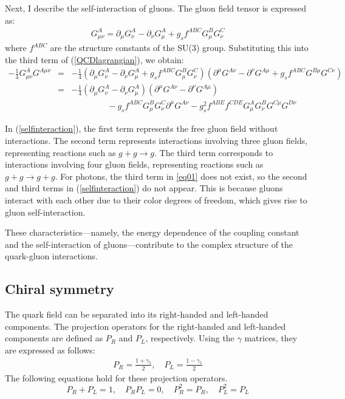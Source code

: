         Next, I describe the self-interaction of gluons. The gluon field tensor is expressed as:
        \begin{eqnarray}
        \label{eq01}
            G^A_{\mu\nu} = \partial_\mu G^A_\nu - \partial_\nu G^A_\mu + g_s f^{ABC}G^B_\mu G^C_\nu
        \end{eqnarray}  
        where $f^{ABC}$ are the structure constants of the SU(3) group. Substituting this into the third term of (\ref{QCDlagrangian}), we obtain:  
        \begin{eqnarray}
            \nonumber
            -\frac{1}{4}G^A_{\mu\nu} G^{A\mu\nu} &=& -\frac{1}{4}(\partial_\mu G^A_\nu - \partial_\nu G^A_\mu + g_s f^{ABC} G^B_\mu G^C_\nu)(\partial^\mu G^{A\nu} - \partial^{\nu} G^{A\mu} + g_s f^{ABC} G^{B\mu} G^{C\nu})\\ 
            \nonumber
            &=& -\frac{1}{4}(\partial_\mu G^A_\nu - \partial_\nu G^A_\mu)(\partial^\mu G^{A\nu} - \partial^{\nu} G^{A\mu}) \\
            \label{selfinteraction}
            && \qquad\qquad\ - g_s f^{ABC}G^B_\mu G^C_\nu \partial^\mu G^{A\nu} - g_s^2 f^{ABE}f^{CDE}G^A_\mu G^B_\nu G^{C\mu}G^{D\nu}
        \end{eqnarray}  
        
        In (\ref{selfinteraction}), the first term represents the free gluon field without interactions. The second term represents interactions involving three gluon fields, representing reactions such as $g+g \rightarrow g$. The third term corresponds to interactions involving four gluon fields, representing reactions such as $g+g \rightarrow g+g$. For photons, the third term in \eqref{eq01} does not exist, so the second and third terms in (\ref{selfinteraction}) do not appear. This is because gluons interact with each other due to their color degrees of freedom, which gives rise to gluon self-interaction.  
        
        These characteristics—namely, the energy dependence of the coupling constant and the self-interaction of gluons—contribute to the complex structure of the quark-gluon interactions.
    \subsection{Chiral symmetry}
    \label{Intro:Chiral_symmetry}  
        The quark field can be separated into its right-handed and left-handed components. The projection operators for the right-handed and left-handed components are defined as $P_R$ and $P_L$, respectively. Using the $\gamma$ matrices, they are expressed as follows:  
        \begin{eqnarray}  
            P_R = \frac{1+\gamma_5}{2}, \quad P_L = \frac{1-\gamma_5}{2} 
        \end{eqnarray}  
        The following equations hold for these projection operators.
        \begin{equation}  
            P_R + P_L = 1, \quad P_R P_L = 0, \quad P_R^2 = P_R, \quad P_L^2 = P_L  
        \end{equation}  
        
